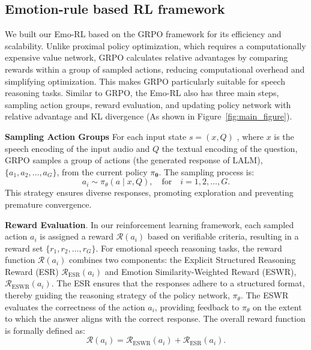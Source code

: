 \documentclass[11pt]{article}
\begin{document}
\subsection{Emotion-rule based RL framework}
We built our Emo-RL based on the GRPO framework for its efficiency and scalability. Unlike proximal policy optimization, which requires a computationally expensive value network, GRPO calculates relative advantages by comparing rewards within a group of sampled actions, reducing computational overhead and simplifying optimization. This makes GRPO particularly suitable for speech reasoning tasks. Similar to GRPO, the Emo-RL also has three main steps, sampling action groups, reward evaluation, and updating policy network with relative advantage and KL divergence (As shown in Figure~\ref{fig:main_figure}).

\textbf{Sampling Action Groups} For each input state $s=(x,Q)$ , where $x$ is the speech encoding of the input audio and $Q$ the textual encoding of the question, GRPO samples a group of actions (the generated response of LALM), $\{a_{1},a_{2},\ldots,a_{G}\}$, from the current policy $\pi_{\boldsymbol{\theta}}$. The sampling process is:
\begin{equation}
	a_{i}\sim\pi_{\theta}(a\mid x,Q),\quad{\mathrm{for}}\quad i=1,2,\ldots,G.
\end{equation}
This strategy ensures diverse responses, promoting exploration and preventing premature convergence.

\textbf{Reward Evaluation}. In our reinforcement learning framework, each sampled action $a_{i}$ is assigned a reward $\mathcal{R}(a_{i})$ based on verifiable criteria, resulting in a reward set $\{r_{1},r_{2},\dots,r_{G}\}$. For emotional speech reasoning tasks, the reward function $\mathcal{R}(a_{i})$ combines two components: the Explicit Structured Reasoning Reward (ESR) $\mathcal{R}_{\mathrm{ESR}}(a_{i})$ and Emotion Similarity-Weighted Reward (ESWR), $\mathcal{R}_{\mathrm{ESWR}}(a_{i})$. The ESR ensures that the responses adhere to a structured format, thereby guiding the reasoning strategy of the policy network, $\pi_{\theta}$. The ESWR evaluates the correctness of the action $a_{i}$, providing feedback to $\pi_{\theta}$ on the extent to which the answer aligns with the correct response. The overall reward function is formally defined as:
\begin{equation}
	\mathcal{R}(a_{i})=\mathcal{R}_{\mathrm{ESWR}}(a_{i})+\mathcal{R}_{\mathrm{ESR}}(a_{i}).
\end{equation}
\end{document}
